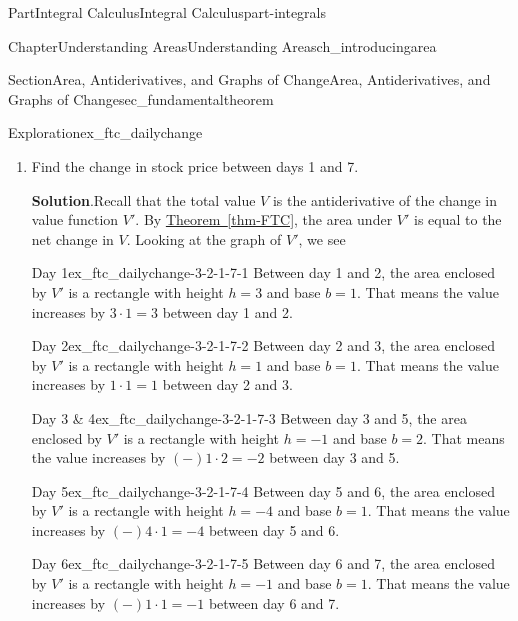 \documentclass{tufte-book}
\newcommand{\blocktitlefont}{\relax}
\newcommand{\xreffont}{\relax}
\numberwithin{equation}{chapter}
\begin{document}
\begin{partptx}{Part}{Integral Calculus}{}{Integral Calculus}{}{}{part-integrals}
\begin{chapterptx}{Chapter}{Understanding Areas}{}{Understanding Areas}{}{}{ch_introducingarea}
\begin{sectionptx}{Section}{Area, Antiderivatives, and Graphs of Change}{}{Area, Antiderivatives, and Graphs of Change}{}{}{sec_fundamentaltheorem}
\begin{exploration}{Exploration}{}{ex_ftc_dailychange}
\begin{enumerate}[font=\bfseries,label=(\alph*),ref=\alph*]
\begin{image}{0.25}{0.5}{0.25}{}
{
}%
\end{image}%
\item{}Find the change in stock price between days 1 and 7.%
\par\smallskip%
\noindent\textbf{\blocktitlefont Solution}.\hypertarget{ex_ftc_dailychange-3-2}{}\quad{}Recall that the total value \(V\) is the antiderivative of the change in value function  \(V'\). By \hyperref[thm-FTC]{Theorem~{\xreffont\ref{thm-FTC}}}, the area under \(V'\) is equal to the net change in \(V\).  Looking at the graph of \(V'\), we see%
\begin{descriptionlist}
\begin{dlimedium}{Day 1}{ex_ftc_dailychange-3-2-1-7-1}%
Between day 1 and 2, the area enclosed by \(V'\) is a rectangle with height \(h=3\) and base \(b=1\). That means the value increases by \(3\cdot 1= 3\)\textdollar{} between day 1 and 2.%
\end{dlimedium}%
\begin{dlimedium}{Day 2}{ex_ftc_dailychange-3-2-1-7-2}%
Between day 2 and 3, the area enclosed by \(V'\) is a rectangle with height \(h=1\) and base \(b=1\). That means the value increases by \(1\cdot 1 = 1\)\textdollar{} between day 2 and 3.%
\end{dlimedium}%
\begin{dlimedium}{Day 3 \& 4}{ex_ftc_dailychange-3-2-1-7-3}%
Between day 3 and 5, the area enclosed by \(V'\) is a rectangle with height \(h=-1\) and base \(b=2\). That means the value increases by \((-) 1\cdot 2 = -2 \)\textdollar{} between day 3 and 5.%
\end{dlimedium}%
\begin{dlimedium}{Day 5}{ex_ftc_dailychange-3-2-1-7-4}%
Between day 5 and 6, the area enclosed by \(V'\) is a rectangle with height \(h=-4\) and base \(b=1\). That means the value increases by \((-) 4\cdot 1 = -4 \)\textdollar{} between day 5 and 6.%
\end{dlimedium}%
\begin{dlimedium}{Day 6}{ex_ftc_dailychange-3-2-1-7-5}%
Between day 6 and 7, the area enclosed by \(V'\) is a rectangle with height \(h=-1\) and base \(b=1\). That means the value increases by \((-) 1\cdot 1 = -1 \)\textdollar{} between day 6 and 7.%
\end{dlimedium}%
\end{descriptionlist}

\end{enumerate}
\end{exploration}
\end{sectionptx}
\end{chapterptx}
\end{partptx}
\end{document}
